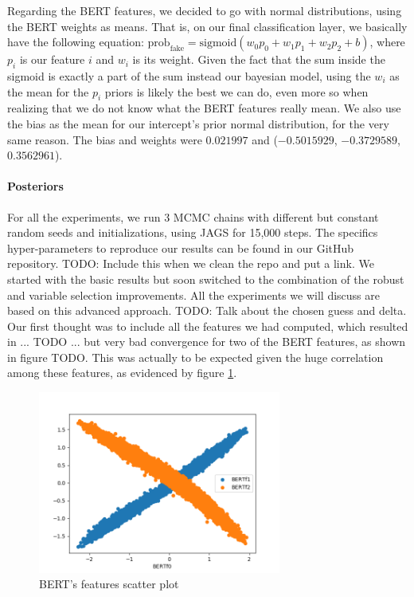 \documentclass[man, floatsintext, 10pt]{apa6}
\begin{document}
Regarding the BERT features, we decided to go with normal distributions, using the BERT weights as means. That is, on our final classification layer, we basically have the following equation: $\text{prob}_{\text{fake}} = \text{sigmoid} (w_0 p_0 + w_1 p_1 + w_2 p_2 + b)$, where $p_i$ is our feature $i$ and $w_i$ is its weight. Given the fact that the sum inside the sigmoid is exactly a part of the sum instead our bayesian model, using the $w_i$ as the mean for the $p_i$ priors is likely the best we can do, even more so when realizing that we do not know what the BERT features really mean. We also use the bias as the mean for our intercept's prior normal distribution, for the very same reason. The bias and weights were $0.021997$ and ($-0.5015929$, $-0.3729589$, $0.3562961$). 

\vspace{2mm}

\paragraph{Posteriors} For all the experiments, we run 3 MCMC chains with different but constant random seeds and initializations, using JAGS for 15,000 steps. The specifics hyper-parameters to reproduce our results can be found in our GitHub repository. TODO: Include this when we clean the repo and put a link. We started with the basic results but soon switched to the combination of the robust and variable selection improvements. All the experiments we will discuss are based on this advanced approach. TODO: Talk about the chosen guess and delta. Our first thought was to include all the features we had computed, which resulted in ... TODO ... but very bad convergence for two of the BERT features, as shown in figure TODO. This was actually to be expected given the huge correlation among these features, as evidenced by figure \ref{BERTf}.

\begin{figure}
\includegraphics[width=8cm]{BERTFeaturesScatterPlot.png}
\caption{BERT's features scatter plot}
  \label{BERTf}
\end{figure}
\end{document}
